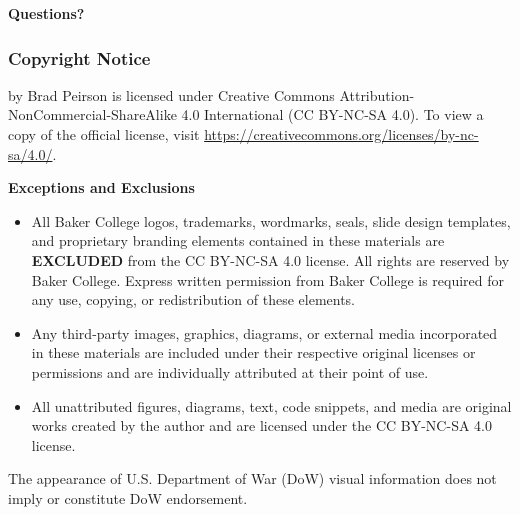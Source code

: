 \begin{frame}
    \centering
    {\Huge \textbf{\textcolor{BakerADARed}{Questions?}}}
\end{frame}

\begin{frame}
    \frametitle{Copyright Notice}
    
    {\scriptsize
    \PresTitle {} by Brad Peirson is licensed under Creative Commons Attribution-NonCommercial-ShareAlike 4.0 International (CC BY-NC-SA 4.0). To view a copy of the official license, visit \href{https://creativecommons.org/licenses/by-nc-sa/4.0/}{https://creativecommons.org/licenses/by-nc-sa/4.0/}.

    \vspace{0.5em}

    \textbf{Exceptions and Exclusions}

    \begin{itemize}
        \item[Baker College Branding \& Trademarks:]All Baker College logos, trademarks, wordmarks, seals, slide design templates, and proprietary branding elements contained in these materials are \textbf{EXCLUDED} from the CC BY-NC-SA 4.0 license. All rights are reserved by Baker College. Express written permission from Baker College is required for any use, copying, or redistribution of these elements.
        \item[Third-Party Media \& Content:] Any third-party images, graphics, diagrams, or external media incorporated in these materials are included under their respective original licenses or permissions and are individually attributed at their point of use. 
        \item[Original Author Content:] All unattributed figures, diagrams, text, code snippets, and media are original works created by the author and are licensed under the CC BY-NC-SA 4.0 license.
    \end{itemize}

    The appearance of U.S. Department of War (DoW) visual information does not imply or constitute DoW endorsement.
    \par}
\end{frame}




